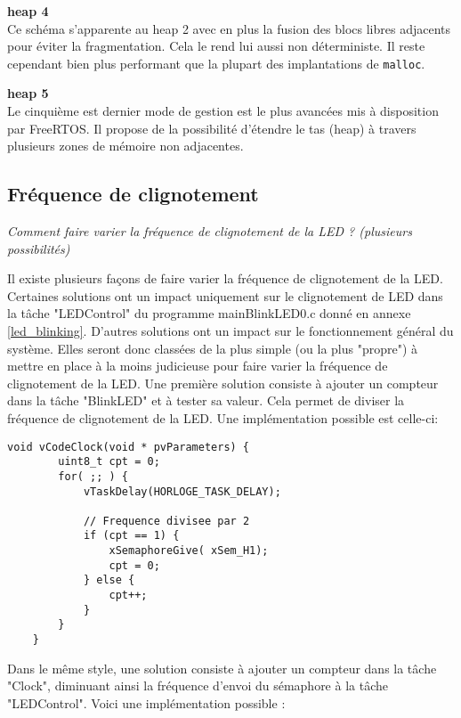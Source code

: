 \noindent
\textbf{heap 4} \\
Ce schéma s'apparente au heap 2 avec en plus la fusion des blocs libres adjacents pour éviter la fragmentation.
Cela le rend lui aussi non déterministe.
Il reste cependant bien plus performant que la plupart des implantations de \texttt{malloc}.

\noindent
\textbf{heap 5} \\
Le cinquième est dernier mode de gestion est le plus avancées mis à disposition par FreeRTOS.
Il propose de la possibilité d'étendre le tas (heap) à travers plusieurs zones de mémoire non adjacentes.


\subsection{Fréquence de clignotement}

\textit{Comment faire varier la fréquence de clignotement de la LED ? (plusieurs possibilités)}
\gap

Il existe plusieurs façons de faire varier la fréquence de clignotement de la LED.
Certaines solutions ont un impact uniquement sur le clignotement de LED dans la tâche "LEDControl" du programme mainBlinkLED0.c donné en annexe \ref{led_blinking}.
D'autres solutions ont un impact sur le fonctionnement général du système.
Elles seront donc classées de la plus simple (ou la plus "propre") à mettre en place à la moins judicieuse pour faire varier la fréquence de clignotement de la LED.
Une première solution consiste à ajouter un compteur dans la tâche "BlinkLED" et à tester sa valeur.
Cela permet de diviser la fréquence de clignotement de la LED.
Une implémentation possible est celle-ci:

\begin{lstlisting}[style=CStyle]
    void vCodeClock(void * pvParameters) {
        uint8_t cpt = 0;
        for( ;; ) {
            vTaskDelay(HORLOGE_TASK_DELAY);
            
            // Frequence divisee par 2
            if (cpt == 1) {
                xSemaphoreGive( xSem_H1);
                cpt = 0;
            } else {
                cpt++;
            }
        }
    }
\end{lstlisting}

Dans le même style, une solution consiste à ajouter un compteur dans la tâche "Clock", diminuant ainsi la fréquence d'envoi du sémaphore à la tâche "LEDControl".
Voici une implémentation possible :

